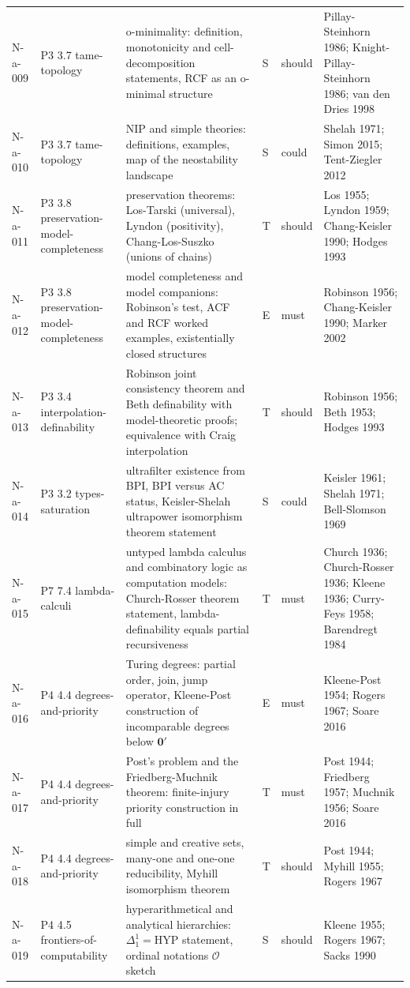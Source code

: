 \begin{longtable}{@{}p{0.52in}p{0.85in}p{2.5in}p{0.22in}p{0.42in}p{1.95in}@{}}
N-a-009 & P3 3.7 tame-topology & o-minimality: definition, monotonicity and cell-decomposition statements, RCF as an o-minimal structure & S & should & Pillay-Steinhorn 1986; Knight-Pillay-Steinhorn 1986; van den Dries 1998 \\
N-a-010 & P3 3.7 tame-topology & NIP and simple theories: definitions, examples, map of the neostability landscape & S & could & Shelah 1971; Simon 2015; Tent-Ziegler 2012 \\
N-a-011 & P3 3.8 preservation-model-completeness & preservation theorems: Los-Tarski (universal), Lyndon (positivity), Chang-Los-Suszko (unions of chains) & T & should & Los 1955; Lyndon 1959; Chang-Keisler 1990; Hodges 1993 \\
N-a-012 & P3 3.8 preservation-model-completeness & model completeness and model companions: Robinson's test, ACF and RCF worked examples, existentially closed structures & E & must & Robinson 1956; Chang-Keisler 1990; Marker 2002 \\
N-a-013 & P3 3.4 interpolation-definability & Robinson joint consistency theorem and Beth definability with model-theoretic proofs; equivalence with Craig interpolation & T & should & Robinson 1956; Beth 1953; Hodges 1993 \\
N-a-014 & P3 3.2 types-saturation & ultrafilter existence from BPI, BPI versus AC status, Keisler-Shelah ultrapower isomorphism theorem statement & S & could & Keisler 1961; Shelah 1971; Bell-Slomson 1969 \\
N-a-015 & P7 7.4 lambda-calculi & untyped lambda calculus and combinatory logic as computation models: Church-Rosser theorem statement, lambda-definability equals partial recursiveness & T & must & Church 1936; Church-Rosser 1936; Kleene 1936; Curry-Feys 1958; Barendregt 1984 \\
N-a-016 & P4 4.4 degrees-and-priority & Turing degrees: partial order, join, jump operator, Kleene-Post construction of incomparable degrees below \(\mathbf 0'\) & E & must & Kleene-Post 1954; Rogers 1967; Soare 2016 \\
N-a-017 & P4 4.4 degrees-and-priority & Post's problem and the Friedberg-Muchnik theorem: finite-injury priority construction in full & T & must & Post 1944; Friedberg 1957; Muchnik 1956; Soare 2016 \\
N-a-018 & P4 4.4 degrees-and-priority & simple and creative sets, many-one and one-one reducibility, Myhill isomorphism theorem & T & should & Post 1944; Myhill 1955; Rogers 1967 \\
N-a-019 & P4 4.5 frontiers-of-computability & hyperarithmetical and analytical hierarchies: \(\Delta^1_1=\mathrm{HYP}\) statement, ordinal notations \(\mathcal O\) sketch & S & should & Kleene 1955; Rogers 1967; Sacks 1990 \\

\end{longtable}
